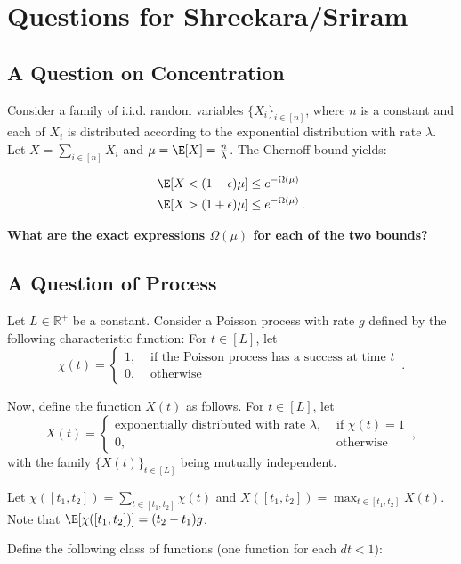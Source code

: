 \section{Questions for Shreekara/Sriram}

\subsection{A Question on Concentration}

Consider a family of i.i.d. random variables $\{ X_i \}_{i \in [n]}$, where $n$ is a constant
and each of $X_i$ is distributed according to the exponential distribution with rate $\lambda$.
Let $X = \sum_{i \in [n]} X_i$ and $\mu = \E[X] = \frac{n}{\lambda}$.
The Chernoff bound yields:

\begin{align*}
  \E[X < (1 - \epsilon)\mu] &\leq e^{-\Omega(\mu)}\\
  \E[X > (1 + \epsilon)\mu] &\leq e^{-\Omega(\mu)}\,.
\end{align*}

\textbf{What are the exact expressions $\Omega(\mu)$ for each of the two bounds?}

\subsection{A Question of Process}

Let $L \in \mathbb{R}^+$ be a constant. Consider a Poisson process with rate $g$ defined by the following characteristic function: For $t \in [L]$, let
\[
  \chi(t) = \begin{cases}
    1, & \text{ if the Poisson process has a success at time } t\\
    0, & \text{ otherwise }
  \end{cases}\,.
\]

Now, define the function $X(t)$ as follows. For $t \in [L]$, let
\[
  X(t) = \begin{cases}
    \text{exponentially distributed with rate } \lambda, & \text{ if } \chi(t) = 1\\
    0, & \text{ otherwise }
  \end{cases}\,,
\] with the family $\{ X(t) \}_{t \in [L]}$ being mutually independent.

Let $\chi([t_1, t_2]) = \sum_{t \in [t_1, t_2]} \chi(t)$ and $X([t_1, t_2]) = \max_{t \in [t_1, t_2]} X(t)$.
Note that $\E[\chi([t_1, t_2])] = (t_2 - t_1)g$.

Define the following class of functions (one function for each $dt < 1$):

